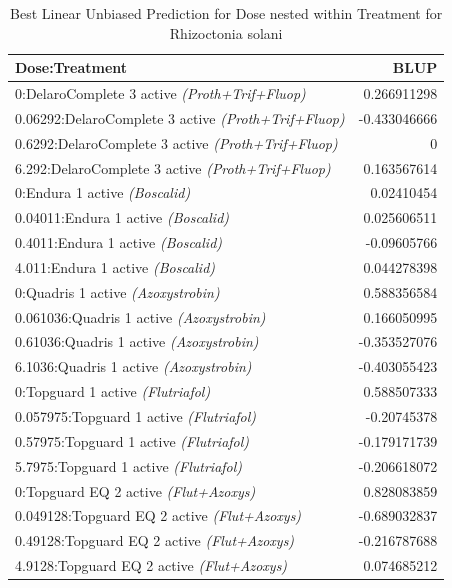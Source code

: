 \documentclass[
  10pt,
  letterpaper,
  twocolumn]{article}
\begin{document}
\vspace{0.1cm}

\begin{table}[ht]
\centering
\small
\caption{Best Linear Unbiased Prediction for Dose nested within Treatment for Rhizoctonia solani }
\renewcommand{\arraystretch}{1.2}
\begin{tabular}{|p{6.4cm}|r|}
\hline
\textbf{Dose:Treatment} & \textbf{BLUP} \\
\hline
0:DelaroComplete 3 active \textit{(Proth+Trif+Fluop)} & 0.266911298 \\
0.06292:DelaroComplete 3 active \textit{(Proth+Trif+Fluop)} & -0.433046666\\
0.6292:DelaroComplete 3 active \textit{(Proth+Trif+Fluop)} & 0 \\
6.292:DelaroComplete 3 active \textit{(Proth+Trif+Fluop)} & 0.163567614 \\
0:Endura 1 active \textit{(Boscalid)} & 0.02410454 \\
0.04011:Endura 1 active \textit{(Boscalid)} & 0.025606511 \\
0.4011:Endura 1 active \textit{(Boscalid)} & -0.09605766 \\
4.011:Endura 1 active \textit{(Boscalid)} & 0.044278398 \\
0:Quadris 1 active \textit{(Azoxystrobin)} & 0.588356584 \\
0.061036:Quadris 1 active \textit{(Azoxystrobin)} & 0.166050995 \\
0.61036:Quadris 1 active \textit{(Azoxystrobin)} & -0.353527076 \\
6.1036:Quadris 1 active \textit{(Azoxystrobin)} & -0.403055423 \\
0:Topguard 1 active \textit{(Flutriafol)} & 0.588507333\\
0.057975:Topguard 1 active \textit{(Flutriafol)} & -0.20745378 \\
0.57975:Topguard 1 active \textit{(Flutriafol)} & -0.179171739 \\
5.7975:Topguard 1 active \textit{(Flutriafol)} & -0.206618072 \\
0:Topguard EQ 2 active \textit{(Flut+Azoxys)} & 0.828083859\\
0.049128:Topguard EQ 2 active \textit{(Flut+Azoxys)} & -0.689032837 \\
0.49128:Topguard EQ 2 active \textit{(Flut+Azoxys)} & -0.216787688 \\
4.9128:Topguard EQ 2 active \textit{(Flut+Azoxys)} & 0.074685212 \\
\hline
\end{tabular}
\end{table}
\end{document}
